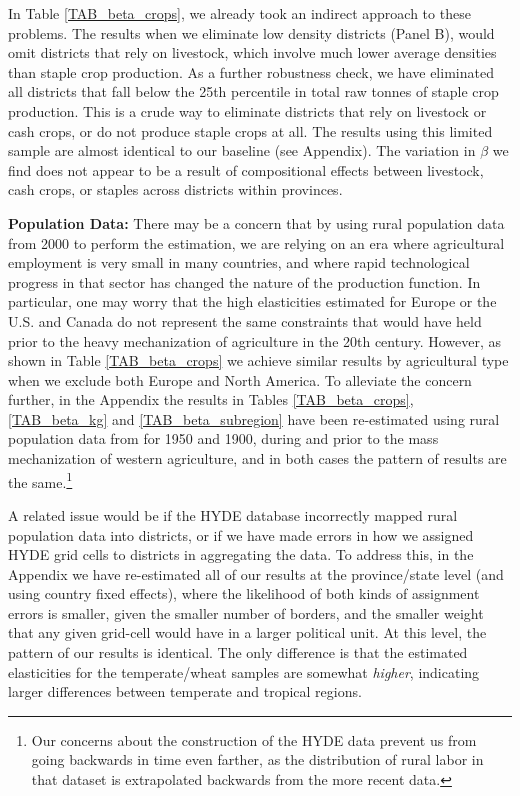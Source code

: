 \documentclass[11pt]{article}
\begin{document}
In Table \ref{TAB_beta_crops}, we already took an indirect approach to these problems. The results when we eliminate low density districts (Panel B), would omit districts that rely on livestock, which involve much lower average densities than staple crop production. As a further robustness check, we have eliminated all districts that fall below the 25th percentile in total raw tonnes of staple crop production. This is a crude way to eliminate districts that rely on livestock or cash crops, or do not produce staple crops at all. The results using this limited sample are almost identical to our baseline (see Appendix). The variation in $\beta$ we find does not appear to be a result of compositional effects between livestock, cash crops, or staples across districts within provinces.

\vspace{.5cm}\noindent\textbf{Population Data:} There may be a concern that by using rural population data from 2000 to perform the estimation, we are relying on an era where agricultural employment is very small in many countries, and where rapid technological progress in that sector has changed the nature of the production function. In particular, one may worry that the high elasticities estimated for Europe or the U.S. and Canada do not represent the same constraints that would have held prior to the heavy mechanization of agriculture in the 20th century. However, as shown in Table \ref{TAB_beta_crops} we achieve similar results by agricultural type when we exclude both Europe and North America. To alleviate the concern further, in the Appendix the results in Tables \ref{TAB_beta_crops}, \ref{TAB_beta_kg} and \ref{TAB_beta_subregion} have been re-estimated using rural population data from \citet{hyde31} for 1950 and 1900, during and prior to the mass mechanization of western agriculture, and in both cases the pattern of results are the same.\footnote{Our concerns about the construction of the HYDE data prevent us from going backwards in time even farther, as the distribution of rural labor in that dataset is extrapolated backwards from the more recent data.}

A related issue would be if the HYDE database incorrectly mapped rural population data into districts, or if we have made errors in how we assigned HYDE grid cells to districts in aggregating the data. To address this, in the Appendix we have re-estimated all of our results at the province/state level (and using country fixed effects), where the likelihood of both kinds of assignment errors is smaller, given the smaller number of borders, and the smaller weight that any given grid-cell would have in a larger political unit. At this level, the pattern of our results is identical. The only difference is that the estimated elasticities for the temperate/wheat samples are somewhat \textit{higher}, indicating larger differences between temperate and tropical regions.
\end{document}
